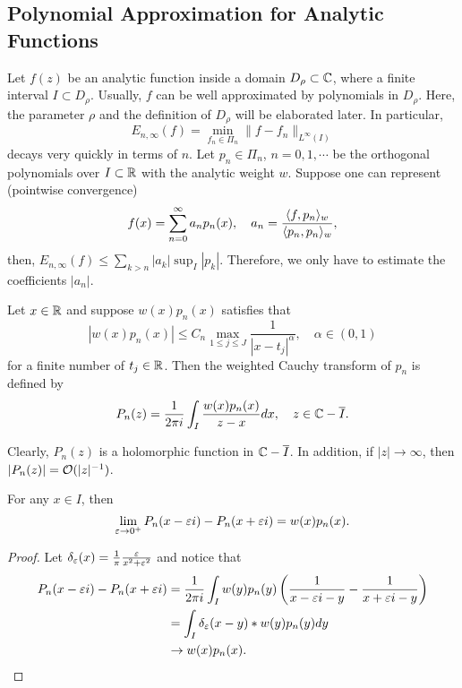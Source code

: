 \subsection{Polynomial Approximation for Analytic Functions}
Let $f(z)$ be an analytic function inside a domain
$D_{\rho}\subset \mathbb C$, where a finite interval $I\subset D_{\rho}$. Usually, $f$ can be well approximated by polynomials in $D_{\rho}$. Here, the parameter $\rho$ and the definition of $D_{\rho}$ will be elaborated later. In particular,   
\begin{equation}
    E_{n,\infty}(f) = \min_{f_n\in \Pi_n} \|f - f_n\|_{L^{\infty}(I)}
\end{equation}
decays very quickly in terms of $n$. Let $p_n\in \Pi_n$, $n = 0,1,\cdots$ be the orthogonal polynomials over $I\subset \mathbb R$ with the analytic weight $w$.  Suppose one can represent (pointwise convergence)
\begin{equation}
\label{EQ: 4-COEF-POLY}
    f(x) = \sum_{n=0}^{\infty} a_n p_n(x), \quad a_n = \frac{\langle {f, p_n} \rangle_w}{\langle {p_n, p_n} \rangle_w}, 
\end{equation}
then, $E_{n, \infty}(f) \le  \sum_{k > n} | a_k | \sup_{I} \left| p_k \right|$. Therefore, we only have to estimate the coefficients $|a_n|$. 
\begin{definition}
\label{Def: 4-Wei-Cau-Tra}
Let $x\in \mathbb R$ and suppose $w(x) p_n(x)$ satisfies that 
\begin{equation}
    |w(x) p_n(x)| \le C_n \max_{1\le j\le J} \frac{1}{|x - t_j|^{\alpha}}, \quad \alpha \in (0, 1)
\end{equation}
for a finite number of $t_j\in \mathbb R$. Then the weighted Cauchy transform of $p_n$ is defined by 
\begin{equation}
    P_n(z) = \frac{1}{2\pi i} \int_{I} \frac{w(x) p_n(x)}{z - x} dx,\quad z \in \mathbb C - \overline{I}. 
\end{equation}
\end{definition}
Clearly, $P_n(z)$ is a holomorphic function in $\mathbb C - \overline{I}$. In addition, if $|z|\to \infty$, then $|P_n(z)| = \mathcal O(|z|^{-1})$. 
\begin{lemma}
\label{Lem: 4-PLE-For}
    For any $x\in I$, then 
    $$\lim_{\varepsilon\to 0^{+}}P_n(x - \varepsilon i) - P_n(x + \varepsilon i) = w(x) p_n(x). $$ 
\end{lemma}
\begin{proof}
    Let $\delta_{\varepsilon}(x) =  \frac{1}{\pi} \frac{\varepsilon}{x^2 + \varepsilon^2}$ and notice that 
    \begin{equation}
    \begin{aligned}
           P_n(x - \varepsilon i) - P_n(x + \varepsilon i) &= \frac{1}{2\pi i } \int_I w(y)p_n(y) \left(\frac{1}{x - \varepsilon i - y}  - \frac{1}{x + \varepsilon i - y} \right) \\ 
           &= \int_I \delta_{\varepsilon}(x-y) \ast  w(y) p_n(y)  dy \\
           &\to  w(x) p_n(x).
    \end{aligned}
    \end{equation}
\end{proof}
